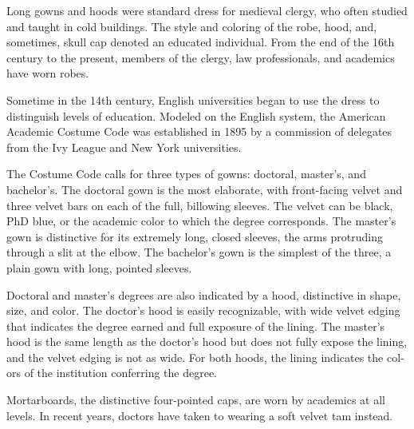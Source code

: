 \documentclass{tufte-handout}
\begin{document}
Long gowns and hoods were standard dress for medieval clergy, who often studied and taught in cold buildings. The style and coloring of the robe, hood, and, sometimes, skull cap denoted an edu­cated individual. From the end of the 16th century to the present, members of the clergy, law profes­sionals, and academics have worn robes.

Sometime in the 14th century, English univer­sities began to use the dress to distinguish levels of education. Modeled on the English system, the American Academic Costume Code was estab­lished in 1895 by a commission of delegates from the Ivy League and New York universities.

The Costume Code calls for three types of gowns: doctoral, master’s, and bachelor’s. The doc­toral gown is the most elaborate, with front-facing velvet and three velvet bars on each of the full, bil­lowing sleeves. The velvet can be black, PhD blue, or the academic color to which the degree corre­sponds. The master’s gown is distinctive for its ex­tremely long, closed sleeves, the arms protruding through a slit at the elbow. The bachelor’s gown is the simplest of the three, a plain gown with long, pointed sleeves.

Doctoral and master’s degrees are also indicat­ed by a hood, distinctive in shape, size, and color. The doctor’s hood is easily recognizable, with wide velvet edging that indicates the degree earned and full exposure of the lining. The master’s hood is the same length as the doctor’s hood but does not fully expose the lining, and the velvet edging is not as wide. For both hoods, the lining indicates the col­ors of the institution conferring the degree.

Mortarboards, the distinctive four-pointed caps, are worn by academics at all levels. In recent years, doctors have taken to wearing a soft velvet tam instead.
\end{document}
